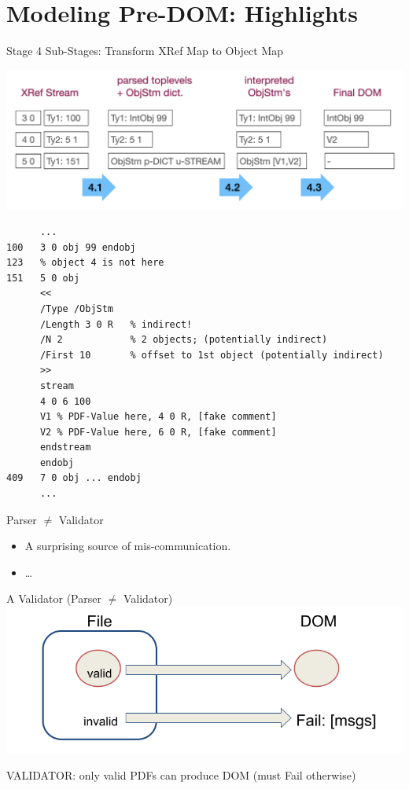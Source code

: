 \documentclass[t,10pt,xcolor={dvipsnames}]{beamer}
\begin{document}
\section{Modeling Pre-DOM: Highlights}
\label{sec:org30bfeda}
\begin{frame}[label={sec:orgbc3a193},fragile]{Stage 4 Sub-Stages: Transform XRef Map to Object Map}
 \begin{center}
\includegraphics[width=0.8\linewidth]{images/diagram1/cropped-diagram1.001.png}
\end{center}
\begin{verbatim}
      ...
100   3 0 obj 99 endobj
123   % object 4 is not here
151   5 0 obj
      <<
      /Type /ObjStm
      /Length 3 0 R   % indirect!
      /N 2            % 2 objects; (potentially indirect)
      /First 10       % offset to 1st object (potentially indirect)
      >>
      stream
      4 0 6 100
      V1 % PDF-Value here, 4 0 R, [fake comment] 
      V2 % PDF-Value here, 6 0 R, [fake comment]
      endstream
      endobj
409   7 0 obj ... endobj
      ...
\end{verbatim}
\end{frame}

\begin{frame}[label={sec:org104b349}]{Parser \(\neq\) Validator}
\begin{itemize}
\item A surprising source of mis-communication.
\item \ldots{}
\end{itemize}
\end{frame}
\begin{frame}[label={sec:orgf45e751}]{A Validator (Parser \(\neq\) Validator)}
\vspace{10pt}
\includegraphics[width=0.80\linewidth]{images/pNEQv-1.png}
\vfill

VALIDATOR: only valid PDFs can produce DOM (must Fail otherwise)
\end{frame}
\end{document}
